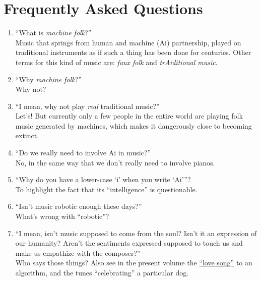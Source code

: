 \documentclass[a4paper,notitlepage,twoside]{book}
\begin{document}
\section{Frequently Asked Questions}
\begin{enumerate}
\item ``What is {\em machine folk}?''\\
Music that springs from human and machine (Ai) partnership,
played on traditional instruments as if such a thing has been done for centuries.
Other terms for this kind of music are: {\em faux folk} and {\em trAiditional music}. 
\item ``Why {\em machine folk}?''\\
Why not?
\item ``I mean, why not play {\em real} traditional music?''\\
Let's! But currently only a few people in the entire world 
are playing folk music generated by machines,
which makes it dangerously close to becoming extinct. 
\item ``Do we really need to involve Ai in music?''\\ 
No, in the same way that we don't really need to involve pianos. 
\item ``Why do you have a lower-case `i' when you write `Ai'''?\\
To highlight the fact that its ``intelligence'' is questionable.
\item ``Isn't music robotic enough these days?'' \\
What's wrong with ``robotic''?
\item ``I mean, isn't music supposed to come from the soul? Isn't it an expression of our humanity? Aren't the sentiments expressed supposed to touch us and make us empathize with the composer?'' \\
Who says those things? Also see in the present volume 
the \hyperlink{piece:WhyAreYou}{``love song''} to an algorithm, 
and the tunes ``celebrating'' a particular dog.

\end{enumerate}
\end{document}
